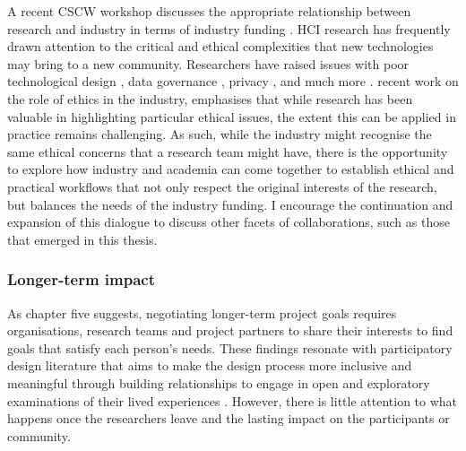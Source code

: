 A recent CSCW workshop discusses the appropriate relationship between research and industry in terms of industry funding \citep{group_patron_2019}. HCI research has frequently drawn attention to the critical and ethical complexities that new technologies may bring to a new community. Researchers have raised issues with poor technological design \citep{ehrenkranz_men_nodate}, data governance \citep{albrecht_how_2016}, privacy \citep{west_data_2019}, and much more \citep{winston2013society}. \cite{longo2020value} recent work on the role of ethics in the industry, emphasises that while research has been valuable in highlighting particular ethical issues, the extent this can be applied in practice remains challenging. As such, while the industry might recognise the same ethical concerns that a research team might have, there is the opportunity to explore how industry and academia can come together to establish ethical and practical workflows that not only respect the original interests of the research, but balances the needs of the industry funding. I encourage the continuation and expansion of this dialogue to discuss other facets of collaborations, such as those that emerged in this thesis.

\subsubsection{Longer-term impact}
\label{LongTermImpact}
As chapter five suggests, negotiating longer-term project goals requires organisations, research teams and project partners to share their interests to find goals that satisfy each person's needs. These findings resonate with participatory design literature that aims to make the design process more inclusive and meaningful through building relationships to engage in open and exploratory examinations of their lived experiences \citep{bannon2018introduction,hendriks_challenges_2014}. However, there is little attention to what happens once the researchers leave and the lasting impact on the participants or community. 


